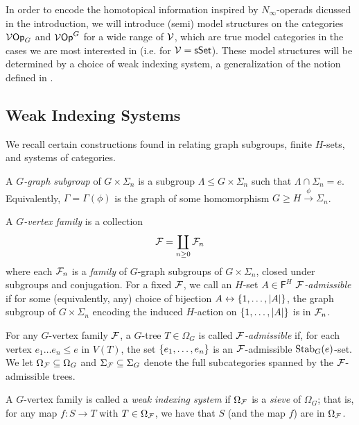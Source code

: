 \documentclass[a4paper,10pt]{article}%
\begin{document}
In order to encode the homotopical information inspired by $N_\infty$-operads dicussed in the introduction, we will introduce (semi) model structures on the categories $\mathcal V\mathsf{Op}_G$ and $\mathcal V\mathsf{Op}^G$ for a wide range of $\mathcal V$, which are true model categories in the cases we are most interested in (i.e. for $\mathcal V = \mathsf{sSet}$).  These model structures will be determined by a choice of weak indexing system, a generalization of the notion defined in \cite{BH15}. 


\subsection{Weak Indexing Systems}

We recall certain constructions found in \cite{Pe17} relating graph subgroups, finite $H$-sets, and systems of categories.
\begin{definition}
  A \textit{$G$-graph subgroup} of $G\times \Sigma_n$ is a subgroup $\Lambda \leq G\times \Sigma_n$ such that $\Lambda \cap \Sigma_n = e$. Equivalently, $\Gamma = \Gamma(\phi)$ is the graph of some homomorphism $G \geq H \xrightarrow{\phi} \Sigma_n$. 
\end{definition}
\begin{definition}
  A \textit{$G$-vertex family} is a collection
\[
\mathcal F = \coprod\limits_{n\geq 0}\mathcal F_n
\]
where each $\mathcal F_n$ is a \textit{family} of $G$-graph subgroups of $G\times \Sigma_n$, closed under subgroups and conjugation. For a fixed $\mathcal F$, we call an $H$-set $A\in \mathsf F^H$ \textit{$\mathcal F$-admissible} if for some (equivalently, any) choice of bijection $A \leftrightarrow \left\{1,\ldots, |A|\right\}$, the graph subgroup of $G\times \Sigma_n$ encoding the induced $H$-action on $\left\{1,\ldots, |A|\right\}$ is in $\mathcal F_n$. 
\end{definition}
\begin{definition}
  For any $G$-vertex family $\mathcal F$, a $G$-tree $T\in \Omega_G$ is called \textit{$\mathcal F$-admissible} if, for each vertex $e_1\ldots e_n \leq e$ in $V(T)$, the set $\left\{e_1,\ldots, e_n\right\}$ is an $\mathcal F$-admissible $\mathrm{Stab}_G(e)$-set. We let $\Omega_{\mathcal F}\subseteq \Omega_G$ and $\Sigma_{\mathcal F}\subseteq \Sigma_G$ denote the full subcategories spanned by the $\mathcal F$-admissible trees.
\end{definition}
\begin{definition}
  A $G$-vertex family is called a \textit{weak indexing system} if $\Omega_{\mathcal F}$ is a \textit{sieve} of $\Omega_G$; that is, for any map $f:S \to T$ with $T\in \Omega_{\mathcal F}$, we have that $S$ (and the map $f$) are in $\Omega_{\mathcal F}$.
\end{definition}
\end{document}
